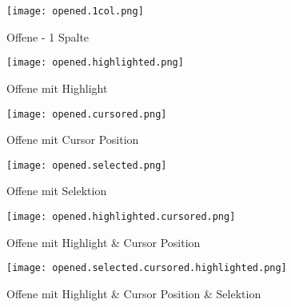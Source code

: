 \begin{figure}[!htb]
    \centering
    \begin{minipage}[b]{0.45\textwidth}
        \centering
        \texttt{[image: opened.1col.png]}
        \caption{Offene  - 1 Spalte}
        \label{img:openedOneColNewComp}
    \end{minipage}
    \hfill
    \begin{minipage}[b]{0.45\textwidth}
        \centering
        \texttt{[image: opened.highlighted.png]}
        \caption{Offene  mit Highlight}
        \label{img:openedHighlightedNewComp}
    \end{minipage}
\end{figure}

\begin{figure}[!htb]
    \centering
    \begin{minipage}[b]{0.45\textwidth}
        \centering
        \texttt{[image: opened.cursored.png]}
        \caption{Offene  mit Cursor Position}
        \label{img:openedCursoredNewComp}
    \end{minipage}
    \hfill
    \begin{minipage}[b]{0.45\textwidth}
        \centering
        \texttt{[image: opened.selected.png]}
        \caption{Offene  mit Selektion}
        \label{img:openedSelectedNewComp}
    \end{minipage}
\end{figure}

\begin{figure}[!htb]
    \centering
    \begin{minipage}[b]{0.45\textwidth}
        \centering
        \texttt{[image: opened.highlighted.cursored.png]}
        \caption{Offene  mit Highlight \& Cursor Position}
        \label{img:openedHighlightedCursoredNewComp}
    \end{minipage}
    \hfill
    \begin{minipage}[b]{0.45\textwidth}
        \centering
        \texttt{[image: opened.selected.cursored.highlighted.png]}
        \caption{Offene  mit Highlight \& Cursor Position \& Selektion}
        \label{img:openedHighlightedCursoredSelectedNewComp}
    \end{minipage}
\end{figure}

